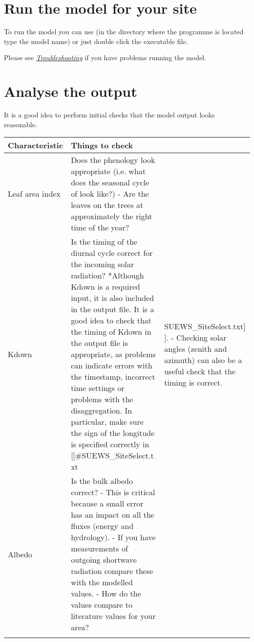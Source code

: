 \documentclass[letterpaper,10pt,english]{sphinxmanual}
\begin{document}
\section{Run the model for your site}
\label{\detokenize{prepare-to-run-the-model:run-the-model-for-your-site}}
To run the model you can use  (in the directory where
the programme is located type the model name) or just double click the
executable file.

Please see {\hyperref[\detokenize{prepare-to-run-the-model:Troubleshooting}]{\emph{Troubleshooting}}} if you have problems
running the model.


\section{Analyse the output}
\label{\detokenize{prepare-to-run-the-model:analyse-the-output}}
It is a good idea to perform initial checks that the model output looks
reasonable.


\begin{savenotes}\sphinxattablestart
\centering
\begin{tabulary}{\linewidth}[t]{|T|T|T|}
\hline
\sphinxstyletheadfamily 
Characteristic
&\sphinxstyletheadfamily 
Things to check
&\sphinxstyletheadfamily \\
\hline
Leaf area index
&
Does the phenology
look appropriate
(i.e. what does the
seasonal cycle of
look like?)
-  Are the leaves on
the trees at
approximately the
right time of the
year?
&\\
\hline
Kdown
&
Is the timing of the
diurnal cycle correct
for the incoming
solar radiation?
*Although Kdown is a
required input, it is
also included in the
output file. It is a
good idea to check
that the timing of
Kdown in the output
file is appropriate,
as problems can
indicate errors with
the timestamp,
incorrect time
settings or problems
with the
disaggregation. In
particular, make sure
the sign of the
longitude is
specified correctly
in
{[}{[}\#SUEWS\_SiteSelect.t
xt
&
SUEWS\_SiteSelect.txt{]}
{]}.
-  Checking solar
angles (zenith and
azimuth) can also
be a useful check
that the timing is
correct.
\\
\hline
Albedo
&
Is the bulk albedo
correct?
-  This is critical
because a small
error has an
impact on all the
fluxes (energy and
hydrology).
-  If you have
measurements of
outgoing shortwave
radiation compare
these with the
modelled values.
-  How do the values
compare to
literature values
for your area?
&\\
\hline&&\\
\hline
\end{tabulary}
\par
\sphinxattableend\end{savenotes}
\end{document}
